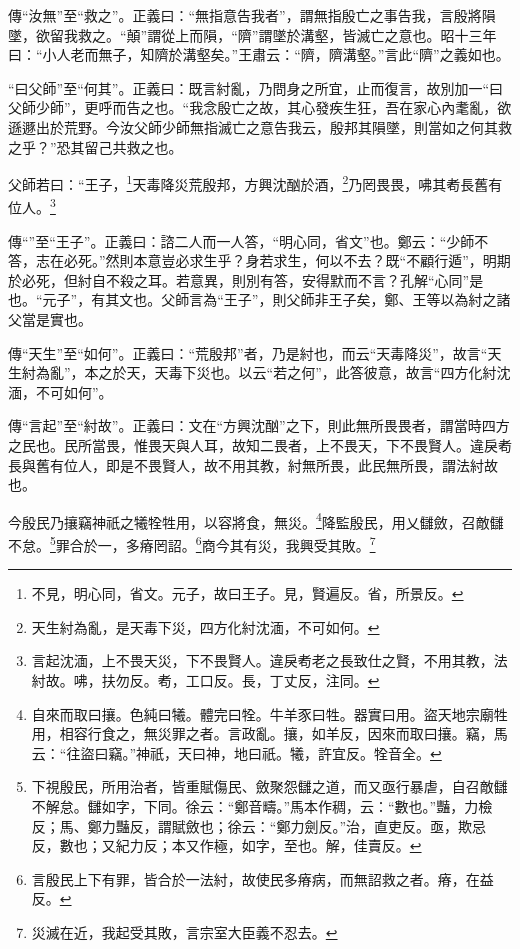 {\noindent\zhuan{}\fzbyks 傳“汝無”至“救之”。正義曰：“無指意告我者”，謂無指殷亡之事告我，言殷將隕墜，欲留我救之。“顛”謂從上而隕，“隮”謂墜於溝壑，皆滅亡之意也。昭十三年曰：“小人老而無子，知隮於溝壑矣。”王肅云：“隮，隮溝壑。”言此“隮”之義如也。 \par}

{\noindent\shu{}\fzkt “曰父師”至“何其”。正義曰：既言紂亂，乃問身之所宜，止而復言，故別加一“曰父師少師”，更呼而告之也。“我念殷亡之故，其心發疾生狂，吾在家心內耄亂，欲遜遯出於荒野。今汝父師少師無指滅亡之意告我云，殷邦其隕墜，則當如之何其救之乎？”恐其留己共救之也。 \par}

父師若曰：“王子，\footnote{不見，明心同，省文。元子，故曰王子。見，賢遍反。省，所景反。}天毒降災荒殷邦，方興沈酗於酒，\footnote{天生紂為亂，是天毒下災，四方化紂沈湎，不可如何。}乃罔畏畏，咈其耇長舊有位人。\footnote{言起沈湎，上不畏天災，下不畏賢人。違戾耇老之長致仕之賢，不用其教，法紂故。咈，扶勿反。耇，工口反。長，丁丈反，注同。}


{\noindent\zhuan{}\fzbyks 傳“”至“王子”。正義曰：諮二人而一人答，“明心同，省文”也。鄭云：“少師不答，志在必死。”然則本意豈必求生乎？身若求生，何以不去？既“不顧行遁”，明期於必死，但紂自不殺之耳。若意異，則別有答，安得默而不言？孔解“心同”是也。“元子”，有其文也。父師言為“王子”，則父師非王子矣，鄭、王等以為紂之諸父當是實也。 \par}

{\noindent\zhuan{}\fzbyks 傳“天生”至“如何”。正義曰：“荒殷邦”者，乃是紂也，而云“天毒降災”，故言“天生紂為亂”，本之於天，天毒下災也。以云“若之何”，此答彼意，故言“四方化紂沈湎，不可如何”。 \par}

{\noindent\zhuan{}\fzbyks 傳“言起”至“紂故”。正義曰：文在“方興沈酗”之下，則此無所畏畏者，謂當時四方之民也。民所當畏，惟畏天與人耳，故知二畏者，上不畏天，下不畏賢人。違戾耇長與舊有位人，即是不畏賢人，故不用其教，紂無所畏，此民無所畏，謂法紂故也。 \par}

今殷民乃攘竊神祇之犧牷牲用，以容將食，無災。\footnote{自來而取曰攘。色純曰犧。體完曰牷。牛羊豕曰牲。器實曰用。盜天地宗廟牲用，相容行食之，無災罪之者。言政亂。攘，如羊反，因來而取曰攘。竊，馬云：“往盜曰竊。”神祇，天曰神，地曰祇。犧，許宜反。牷音全。}降監殷民，用乂讎斂，召敵讎不怠。\footnote{下視殷民，所用治者，皆重賦傷民、斂聚怨讎之道，而又亟行暴虐，自召敵讎不解怠。讎如字，下同。徐云：“鄭音疇。”馬本作稠，云：“數也。”豔，力檢反；馬、鄭力豔反，謂賦斂也；徐云：“鄭力劍反。”治，直吏反。亟，欺忌反，數也；又紀力反；本又作極，如字，至也。解，佳賣反。}罪合於一，多瘠罔詔。\footnote{言殷民上下有罪，皆合於一法紂，故使民多瘠病，而無詔救之者。瘠，在益反。}商今其有災，我興受其敗。\footnote{災滅在近，我起受其敗，言宗室大臣義不忍去。}



